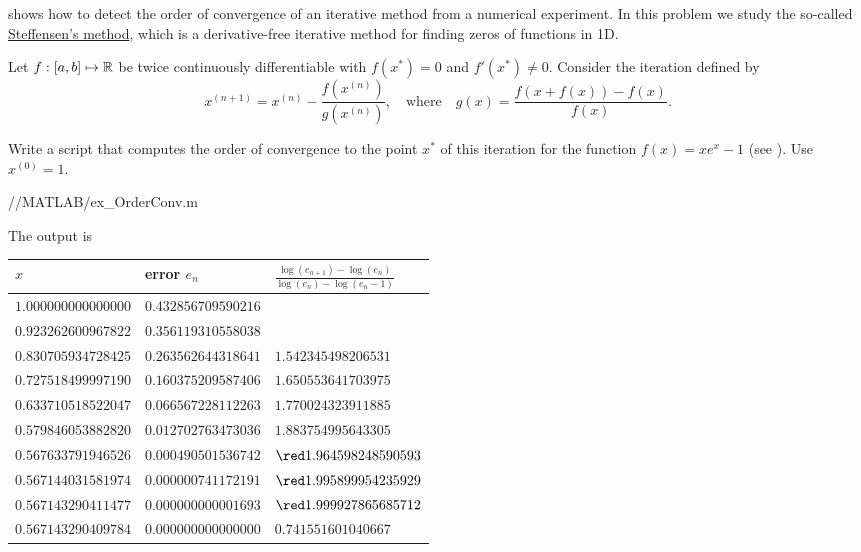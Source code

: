 

\begin{problem} \label{prb:QuadraticConvergence}

 shows how to detect the order of convergence of an iterative method
from a numerical experiment. In this problem we study the so-called
\href{http://en.wikipedia.org/wiki/Steffensen's_method}{Steffensen's method},
which is a derivative-free iterative method for finding zeros of functions in 1D.

Let $f:[a,b]\mapsto\mathbb{R}$ be twice continuously differentiable with $f(x^{\ast})=0$ and $f'(x^{\ast})\not=0$.
Consider the iteration defined by
$$ x^{(n+1)}=x^{(n)}-\frac{f(x^{(n)})}{g(x^{(n)})},\quad \text{where}\quad g(x)=\frac{f(x+f(x))-f(x)}{f(x)}.$$

\begin{subproblem}[2]
Write a \Matlab{} script that computes the order of convergence to the point $x^*$ of this iteration for the function $f(x)=xe^x-1$ (see ). Use $x^{(0)} = 1$.

\cprotEnv \begin{solution}

{\problems/\chpt/MATLAB/ex_OrderConv.m}

The output is\\
\begin{center}
\begin{tabular}{lll}
   $x$   &          error $e_n$   &   $\frac{\log(e_{n+1})-\log(e_n)}{\log(e_{n})-\log(e_n-1)}$ \\
   \hline
   $1.000000000000000 $ & $  0.432856709590216  $ &                    \\
   $0.923262600967822 $ & $  0.356119310558038  $ &                   \\
   $0.830705934728425 $ & $  0.263562644318641  $ & $    1.542345498206531$\\
   $0.727518499997190 $ & $  0.160375209587406  $ & $    1.650553641703975$\\
   $0.633710518522047 $ & $  0.066567228112263  $ & $    1.770024323911885$\\
   $0.579846053882820 $ & $  0.012702763473036  $ & $    1.883754995643305$\\
   $0.567633791946526 $ & $  0.000490501536742  $ & $    {\red1.964598248590593}$\\
   $0.567144031581974 $ & $  0.000000741172191  $ & $    {\red1.995899954235929}$\\
   $0.567143290411477 $ & $  0.000000000001693  $ & $    {\red1.999927865685712}$\\
   $0.567143290409784 $ & $  0.000000000000000  $ & $    0.741551601040667$
\end{tabular}
\end{center}


\end{solution}
\end{subproblem}
\end{problem}
